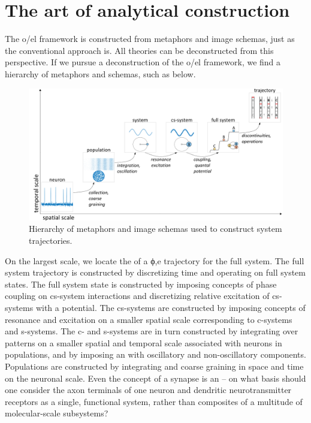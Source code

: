 \section{The art of analytical construction}

The o/el framework is constructed from metaphors and image schemas, just as the conventional approach is. All theories can be deconstructed from this perspective. If we pursue a deconstruction of the o/el framework, we find a hierarchy of metaphors and schemas, such as below. 

  
\begin{figure}
\includegraphics[width=\textwidth]{figures/Tilsen-img169.png}
\caption{Hierarchy of metaphors and image schemas used to construct system trajectories.}
\label{fig:8:3}
\end{figure}
 

  On the largest scale, we locate the  of a ϕ,e  trajectory for the full system. The full system trajectory is constructed by discretizing time and operating on full system states. The full system state is constructed by imposing concepts of phase coupling on cs-system interactions and discretizing relative excitation of cs-systems with a  potential. The cs-systems are constructed by imposing concepts of resonance and excitation on a smaller spatial scale corresponding to c-systems and s-systems. The c- and s-systems are in turn constructed by integrating over patterns on a smaller spatial and temporal scale associated with neurons in populations, and by imposing an  with oscillatory and non-oscillatory components. Populations are constructed by integrating and coarse graining in space and time on the neuronal scale. Even the concept of a synapse is an  -- on what basis should one consider the axon terminals of one neuron and dendritic neurotransmitter receptors as a single, functional system, rather than composites of a multitude of molecular-scale subsystems? 

